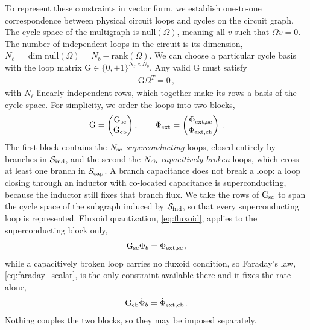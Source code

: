 \documentclass[10pt,aps,pra,onecolumn,superscriptaddress,floatfix,nofootinbib]{revtex4-2}
\begin{document}
To represent these constraints in vector form, we establish one-to-one correspondence between physical circuit loops and cycles on the circuit graph.
The cycle space of the multigraph is $\mathrm{null}(\Omega)$, meaning all $v$ such that $\Omega v = 0$. The number of independent loops in the circuit is its dimension, $N_\ell = \dim\mathrm{null}(\Omega) = N_b - \mathrm{rank}(\Omega)$. 
We can choose a particular cycle basis with the loop matrix $\mathrm{G} \in \{0,\pm1\}^{N_\ell\times N_b}$. Any valid $\mathrm{G}$ must satisfy 
\begin{align}\label{eq:G_OmegaT}
    \mathrm{G}\Omega^T = 0 \, ,
\end{align}
with $N_\ell$ linearly independent rows, which together make its rows a basis of the cycle space. For simplicity, we order the loops into two blocks,
\begin{align}
    \mathrm{G} = \begin{pmatrix}\mathrm{G}_{\rm sc}\\ \mathrm{G}_{\rm cb}\end{pmatrix},
    \qquad
    \Phi_{\rm ext} = \begin{pmatrix}\Phi_{\rm ext, sc}\\ \Phi_{\rm ext, cb}\end{pmatrix} \, .
    \label{eq:G_blocks}
\end{align}
The first block contains the $N_{\rm sc}$ \emph{superconducting} loops, closed entirely by branches in $\mathcal{S}_{\rm ind}$, and the second the $N_{\rm cb}$ \emph{capacitively broken} loops, which cross at least one branch in $\mathcal{S}_{\rm cap}$.
A branch capacitance does not break a loop: a loop closing through an inductor with co-located capacitance is superconducting, because the inductor still fixes that branch flux.
We take the rows of $\mathrm{G}_{\rm sc}$ to span the cycle space of the subgraph induced by $\mathcal{S}_{\rm ind}$, so that every superconducting loop is represented.
Fluxoid quantization, \cref{eq:fluxoid}, applies to the superconducting block only,
\begin{align}
    \mathrm{G}_{\rm sc}\Phi_b = \Phi_{\rm ext, sc} \, ,
    \label{eq:fluxoid_block}
\end{align}
while a capacitively broken loop carries no fluxoid condition, so Faraday's law, \cref{eq:faraday_scalar}, is the only constraint available there and it fixes the rate alone,
\begin{align}
    \mathrm{G}_{\rm cb}\dot\Phi_b = \dot\Phi_{\rm ext, cb} \, .
    \label{eq:faraday_block}
\end{align}
Nothing couples the two blocks, so they may be imposed separately.
\end{document}
